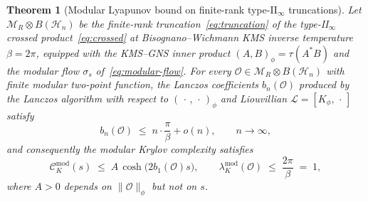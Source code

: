 \documentclass[12pt,a4paper]{article}
\newtheorem{theorem}{Theorem}
\begin{document}
\begin{theorem}[Modular Lyapunov bound on finite-rank type-II$_\infty$
truncations]\label{thm:bound}
Let $\mathcal{M}_R \otimes B(\mathcal{H}_n)$ be the finite-rank
truncation~\eqref{eq:truncation} of the type-II$_\infty$ crossed
product~\eqref{eq:crossed} at Bisognano--Wichmann KMS inverse
temperature $\beta = 2\pi$, equipped with the KMS--GNS inner product
$(A,B)_\phi = \tau(A^* B)$ and the modular flow $\sigma_s$
of~\eqref{eq:modular-flow}.
For every $\mathcal{O} \in \mathcal{M}_R \otimes B(\mathcal{H}_n)$
with finite modular two-point function, the Lanczos coefficients
$b_n(\mathcal{O})$ produced by the Lanczos algorithm with respect
to $(\,\cdot\,,\,\cdot\,)_\phi$ and Liouvillian
$\mathcal{L} = [K_\phi,\,\cdot\,]$ satisfy
\begin{equation}
  b_n(\mathcal{O}) \;\le\; n\cdot\frac{\pi}{\beta} + o(n),
  \qquad n\to\infty,
  \label{eq:bn-bound}
\end{equation}
and consequently the modular Krylov complexity satisfies
\begin{equation}
  \mathcal{C}_K^{\mathrm{mod}}(s)
  \;\le\;
  A\,\cosh\!\bigl(2 b_1(\mathcal{O}) s\bigr),
  \qquad
  \lambda_K^{\mathrm{mod}}(\mathcal{O})
  \;\le\; \frac{2\pi}{\beta} \;=\; 1,
  \label{eq:bound-main}
\end{equation}
where $A>0$ depends on $\|\mathcal{O}\|_\phi$ but not on $s$.
\end{theorem}
\end{document}
